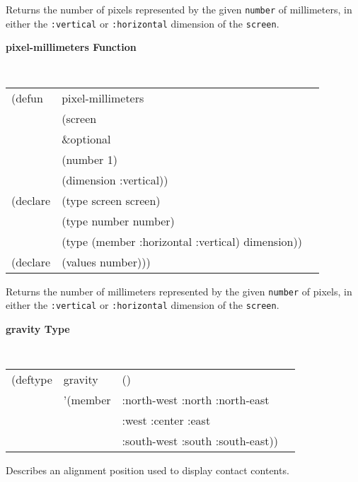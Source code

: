 \begin{flushright} \parbox[t]{6.125in}{
Returns the number of pixels represented by the given {\tt number} of millimeters, in
either the {\tt :vertical} or {\tt :horizontal} dimension of the {\tt screen}.
}\end{flushright}


{\samepage
{\large {\bf pixel-millimeters \hfill Function}} 
\begin{flushright} 
\parbox[t]{6.125in}{
\tt
\begin{tabular}{lll}
\raggedright
(defun & pixel-millimeters \\
       & (screen \\
       & \&optional \\
       & (number 1) \\
       & (dimension :vertical))\\
(declare & (type screen  screen)\\
	  &(type number  number)\\
	  &(type (member :horizontal :vertical)  dimension)) \\ 
(declare & (values number)))
\end{tabular}
\rm
}\end{flushright}}

\begin{flushright} \parbox[t]{6.125in}{
Returns the number of millimeters represented by the given {\tt number} of pixels, in
either the {\tt :vertical} or {\tt :horizontal} dimension of the {\tt screen}.
}\end{flushright}


{\samepage
{\large {\bf gravity \hfill Type}} 
\begin{flushright} \parbox[t]{6.125in}{
\tt
\begin{tabular}{llll}
\raggedright
(deftype  & gravity & () \\
          &'(member & :north-west :north  :north-east\\
          &         & :west       :center :east\\
          &         & :south-west :south  :south-east))
\end{tabular}
\rm

}\end{flushright}}

\begin{flushright} \parbox[t]{6.125in}{
Describes an alignment position used to display contact contents.
}\end{flushright}


